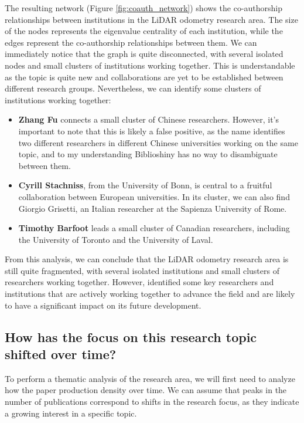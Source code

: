\documentclass{article}
\begin{document}
The resulting network (Figure \ref{fig:coauth_network}) shows the co-authorship relationships between institutions in the LiDAR odometry research area. The size of the nodes represents the eigenvalue centrality of each institution, while the edges represent the co-authorship relationships between them. We can immediately notice that the graph is quite disconnected, with several isolated nodes and small clusters of institutions working together. This is understandable as the topic is quite new and collaborations are yet to be established between different research groups. Nevertheless, we can identify some clusters of institutions working together:
\begin{itemize}
    \item \textbf{Zhang Fu} connects a small cluster of Chinese researchers. However, it's important to note that this is likely a false positive, as the name identifies two different researchers in different Chinese universities working on the same topic, and to my understanding Biblioshiny has no way to disambiguate between them.
    \item \textbf{Cyrill Stachniss}, from the University of Bonn, is central to a fruitful collaboration between European universities. In its cluster, we can also find Giorgio Grisetti, an Italian researcher at the Sapienza University of Rome.
    \item \textbf{Timothy Barfoot} leads a small cluster of Canadian researchers, including the University of Toronto and the University of Laval.
\end{itemize}

From this analysis, we can conclude that the LiDAR odometry research area is still quite fragmented, with several isolated institutions and small clusters of researchers working together. However, identified some key researchers and institutions that are actively working together to advance the field and are likely to have a significant impact on its future development.

\subsection{How has the focus on this research topic shifted over time?}
To perform a thematic analysis of the research area, we will first need to analyze how the paper production density over time. We can assume that peaks in the number of publications correspond to shifts in the research focus, as they indicate a growing interest in a specific topic.
\end{document}
